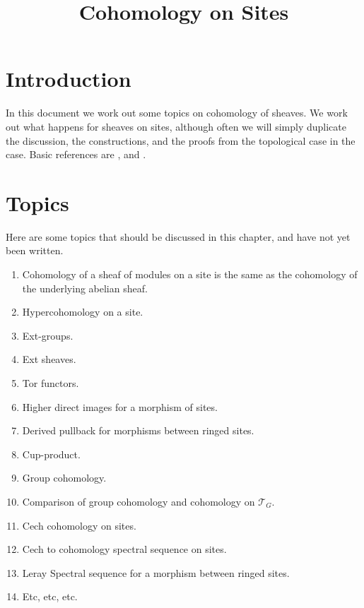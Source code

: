 

%


\title{Cohomology on Sites}


\maketitle

\label{section-phantom}

\tableofcontents

\section{Introduction}
\label{section-introduction}

\noindent
In this document we work out some topics on cohomology of sheaves.
We work out what happens for sheaves on sites,
although often we will simply duplicate the discussion,
the constructions, and the proofs from the topological
case in the case.
Basic references are \cite{SGA4}, \cite{Godement} and \cite{Iversen}.

\section{Topics}
\label{section-topics}

\noindent
Here are some topics that should be discussed in this chapter,
and have not yet been written.
\begin{enumerate}
\item Cohomology of a sheaf of modules on a site is the same
as the cohomology of the underlying abelian sheaf.
\item Hypercohomology on a site.
\item Ext-groups.
\item Ext sheaves.
\item Tor functors.
\item Higher direct images for a morphism of sites.
\item Derived pullback for morphisms between ringed sites.
\item Cup-product.
\item Group cohomology.
\item Comparison of group cohomology and cohomology on $\mathcal{T}_G$.
\item Cech cohomology on sites.
\item Cech to cohomology spectral sequence on sites.
\item Leray Spectral sequence for a morphism between ringed sites.
\item Etc, etc, etc.
\end{enumerate}



